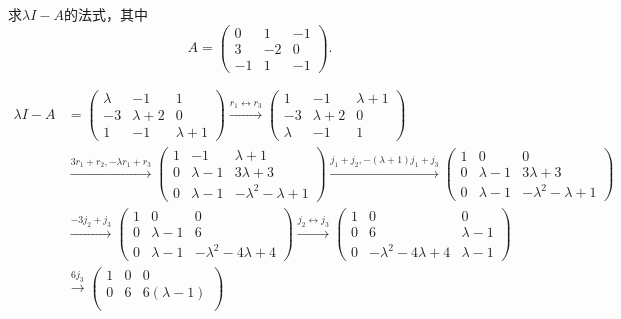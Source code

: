 \documentclass[../../main.tex]{subfiles}
\begin{document}
\begin{example}
求$\lambda I - A$的法式，其中
\[A = \begin{pmatrix}
0 & 1 & -1 \\
3 & -2 & 0 \\
-1 & 1 & -1
\end{pmatrix}.\]
\end{example}
\begin{solution}
\begin{align*}
\lambda I - A &= 
\begin{pmatrix}
\lambda & -1 & 1 \\
-3 & \lambda + 2 & 0 \\
1 & -1 & \lambda + 1
\end{pmatrix}
\xrightarrow{r_1\leftrightarrow r_3}
\begin{pmatrix}
1 & -1 & \lambda + 1 \\
-3 & \lambda + 2 & 0 \\
\lambda & -1 & 1
\end{pmatrix}\\
&\xrightarrow{3r_1+r_2,-\lambda r_1+r_3}
\begin{pmatrix}
1 & -1 & \lambda + 1 \\
0 & \lambda - 1 & 3\lambda + 3 \\
0 & \lambda - 1 & -\lambda^2 - \lambda + 1
\end{pmatrix}
\xrightarrow{j_1+j_2,-(\lambda +1)j_1+j_3}
\begin{pmatrix}
1 & 0 & 0 \\
0 & \lambda - 1 & 3\lambda + 3 \\
0 & \lambda - 1 & -\lambda^2 - \lambda + 1
\end{pmatrix}\\
&\xrightarrow{-3j_2+j_3}
\begin{pmatrix}
1 & 0 & 0 \\
0 & \lambda - 1 & 6 \\
0 & \lambda - 1 & -\lambda^2 - 4\lambda + 4
\end{pmatrix}
\xrightarrow{j_2\leftrightarrow j_3}
\begin{pmatrix}
1 & 0 & 0 \\
0 & 6 & \lambda - 1 \\
0 & -\lambda^2 - 4\lambda + 4 & \lambda - 1
\end{pmatrix}\\
&\xrightarrow{6j_3}
\begin{pmatrix}
1 & 0 & 0 \\
0 & 6 & 6(\lambda - 1) \\

\end{pmatrix}
\end{align*}
\end{solution}
\end{document}

